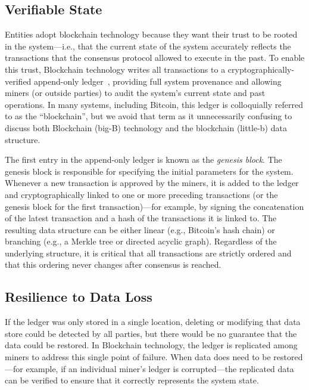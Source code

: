 \subsection{Verifiable State}
Entities adopt blockchain technology because they want their trust to be rooted in the system---i.e., that the current state of the system accurately reflects the transactions that the consensus protocol allowed to execute in the past.
To enable this trust, Blockchain technology writes all transactions to a cryptographically-verified append-only ledger~\cite{tamassia2003authenticated}, providing full system provenance and allowing miners (or outside parties) to audit the system's current state and past operations.
In many systems, including Bitcoin, this ledger is colloquially referred to as the ``blockchain'', but we avoid that term as it unnecessarily confusing to discuss both Blockchain (big-B) technology and the blockchain (little-b) data structure.

The first entry in the append-only ledger is known as the \emph{genesis block}.
The genesis block is responsible for specifying the initial parameters for the system.
Whenever a new transaction is approved by the miners, it is added to the ledger and cryptographically linked to one or more preceding transactions (or the genesis block for the first transaction)---for example, by signing the concatenation of the latest transaction and a hash of the transactions it is linked to.
The resulting data structure can be either linear (e.g., Bitcoin's hash chain) or branching (e.g., a Merkle tree or directed acyclic graph).
Regardless of the underlying structure, it is critical that all transactions are strictly ordered and that this ordering never changes after consensus is reached.


\subsection{Resilience to Data Loss}
If the ledger was only stored in a single location, deleting or modifying that data store could be detected by all parties, but there would be no guarantee that the data could be restored.
In Blockchain technology, the ledger is replicated among miners to address this single point of failure.
When data does need to be restored---for example, if an individual miner's 
ledger is corrupted---the replicated data can be verified to ensure that it 
correctly represents the system state.

